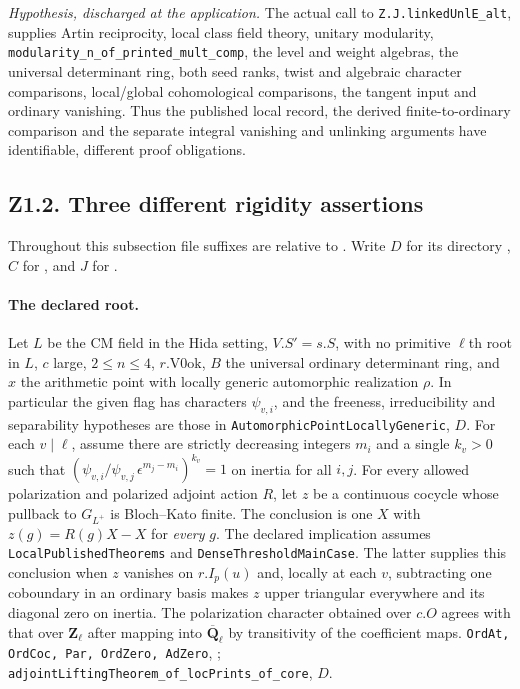 \emph{Hypothesis, discharged at the application.} The actual call to \nolinkurl{Z.J.linkedUnlE_alt},  supplies Artin reciprocity, local class field theory, unitary modularity, \nolinkurl{modularity_n_of_printed_mult_comp}, the level and weight algebras, the universal determinant ring, both seed ranks, twist and algebraic character comparisons, local/global cohomological comparisons, the tangent input and ordinary vanishing. Thus the published local record, the derived finite-to-ordinary comparison and the separate integral vanishing and unlinking arguments have identifiable, different proof obligations.

\subsection{Z1.2. Three different rigidity assertions}
\label{r11:adj}
Throughout this subsection file suffixes are relative to
.
Write $D$ for its directory
,
$C$ for , and $J$ for
.

\paragraph{The declared root.}
Let $L$ be the CM field in the Hida setting, $V.S'=s.S$, with no primitive
$\ell$th root in $L$, $c$ large, $2\le n\le4$, $r.\mathrm{V0ok}$,
$B$ the universal ordinary determinant ring, and $x$ the arithmetic point
with locally generic automorphic realization $\rho$.
In particular the given flag has characters $\psi_{v,i}$, and the freeness,
irreducibility and separability hypotheses are those in
\nolinkurl{AutomorphicPointLocallyGeneric}, $D$.
For each $v\mid\ell$, assume there are strictly decreasing integers $m_i$
and a single $k_v>0$ such that
$(\psi_{v,i}/\psi_{v,j}\,\epsilon^{m_j-m_i})^{k_v}=1$ on inertia
for all $i,j$. For every allowed polarization and polarized adjoint action
$R$, let $z$ be a continuous cocycle whose pullback to $G_{L^+}$ is
Bloch--Kato finite. The conclusion is one $X$ with $z(g)=R(g)X-X$ for
\emph{every} $g$. The declared implication assumes
\nolinkurl{LocalPublishedTheorems} and \nolinkurl{DenseThresholdMainCase}.
The latter supplies this conclusion when $z$ vanishes on $r.I_p(u)$ and,
locally at each $v$, subtracting one coboundary in an ordinary basis
makes $z$ upper triangular everywhere and its diagonal zero on inertia.
The polarization character obtained over $c.O$ agrees with that over
$\mathbf Z_\ell$ after mapping into $\overline{\mathbf Q}_\ell$ by transitivity
of the coefficient maps.
\nolinkurl{OrdAt, OrdCoc, Par, OrdZero, AdZero},
;
\nolinkurl{adjointLiftingTheorem_of_locPrints_of_core},
$D$.

